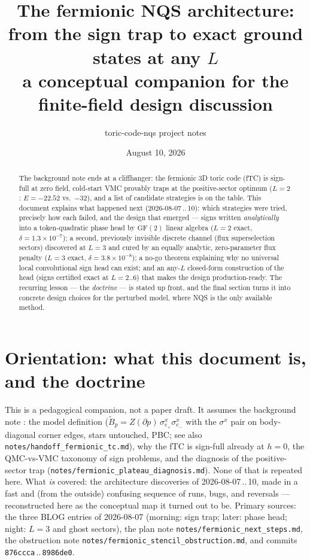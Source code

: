 \documentclass[11pt]{article}
\title{The fermionic NQS architecture:\\
from the sign trap to exact ground states at any $L$\\
{\large a conceptual companion for the finite-field design discussion}}
\author{toric-code-nqs project notes}
\date{August 10, 2026}
\newcommand{\Bt}{\tilde B_p}
\newcommand{\sx}{\sigma^x}
\newcommand{\GF}{\mathrm{GF}(2)}
\newcommand{\file}[1]{\texttt{#1}}
\begin{document}
\maketitle

\begin{abstract}
\noindent
The background note \cite{SignNote} ends at a cliffhanger: the fermionic 3D
toric code (fTC) is sign-full at zero field, cold-start VMC provably traps at
the positive-sector optimum ($L=2$: $E=-22.52$ vs.\ $-32$), and a list of
candidate strategies is on the table. This document explains what happened
next (2026-08-07\,..\,10): which strategies were tried, precisely how each
failed, and the design that emerged --- signs written \emph{analytically} into a
token-quadratic phase head by $\GF$ linear algebra ($L=2$ exact,
$\delta=1.3\times10^{-7}$); a second, previously invisible discrete channel
(flux superselection sectors) discovered at $L=3$ and cured by an equally
analytic, zero-parameter flux penalty ($L=3$ exact, $\delta=3.8\times10^{-8}$);
a no-go theorem explaining why no universal local convolutional sign head can
exist; and an any-$L$ closed-form construction of the head (signs certified
exact at $L=2..6$) that makes the design production-ready. The recurring
lesson --- the \emph{doctrine} --- is stated up front, and the final section turns
it into concrete design choices for the perturbed model, where NQS is the only
available method.
\end{abstract}

\tableofcontents

\section{Orientation: what this document is, and the doctrine}
\label{sec:orientation}

This is a pedagogical companion, not a paper draft. It assumes the background
note \cite{SignNote}: the model definition ($\Bt = Z(\partial p)\,
\sx_{e_+}\sx_{e_-}$ with the $\sx$ pair on body-diagonal corner edges, stars
untouched, PBC; see also \file{notes/handoff\_fermionic\_tc.md}), why the fTC
is sign-full already at $h=0$, the QMC-vs-VMC taxonomy of sign problems, and
the diagnosis of the positive-sector trap
(\file{notes/fermionic\_plateau\_diagnosis.md}). None of that is repeated
here. What \emph{is} covered: the architecture discoveries of
2026-08-07\,..\,10, made in a fast and (from the outside) confusing sequence of
runs, bugs, and reversals --- reconstructed here as the conceptual map it turned
out to be. Primary sources: the three BLOG entries of 2026-08-07 (morning:
sign trap; later: phase head; night: $L=3$ and ghost sectors), the plan note
\file{notes/fermionic\_next\_steps.md}, the obstruction note
\file{notes/fermionic\_stencil\_obstruction.md}, and commits
\texttt{876ccca}\,..\,\texttt{8986de0}.
\end{document}
